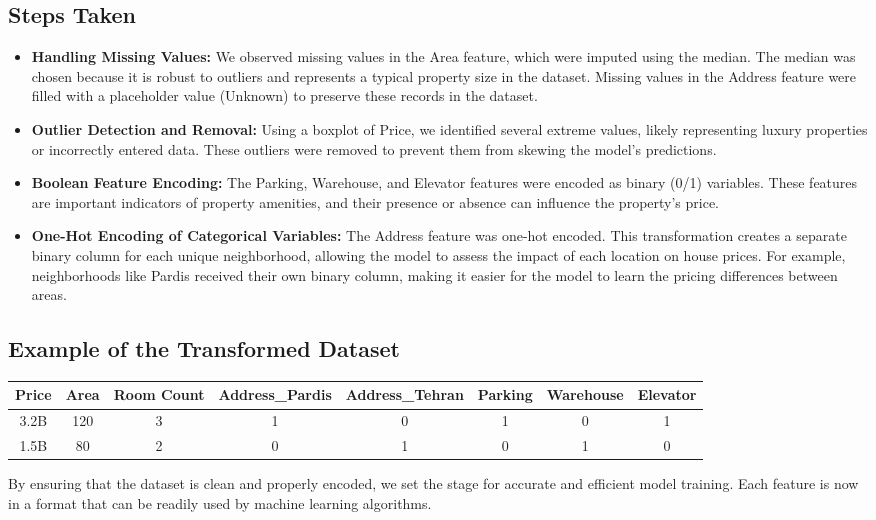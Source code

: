\documentclass{article}
\begin{document}
\subsection{Steps Taken}
\begin{itemize}
    \item \textbf{Handling Missing Values:} We observed missing values in the Area feature, which were imputed using the median. The median was chosen because it is robust to outliers and represents a typical property size in the dataset. Missing values in the Address feature were filled with a placeholder value (Unknown) to preserve these records in the dataset.
    \item \textbf{Outlier Detection and Removal:} Using a boxplot of Price, we identified several extreme values, likely representing luxury properties or incorrectly entered data. These outliers were removed to prevent them from skewing the model's predictions.
    \item \textbf{Boolean Feature Encoding:} The Parking, Warehouse, and Elevator features were encoded as binary (0/1) variables. These features are important indicators of property amenities, and their presence or absence can influence the property's price.
    \item \textbf{One-Hot Encoding of Categorical Variables:} The Address feature was one-hot encoded. This transformation creates a separate binary column for each unique neighborhood, allowing the model to assess the impact of each location on house prices. For example, neighborhoods like Pardis received their own binary column, making it easier for the model to learn the pricing differences between areas.
\end{itemize}

\subsection{Example of the Transformed Dataset}
\begin{center}
\begin{tabular}{cccccccc}
\toprule
Price & Area & Room Count & Address\_Pardis & Address\_Tehran & Parking & Warehouse & Elevator \\
\midrule
3.2B & 120 & 3 & 1 & 0 & 1 & 0 & 1 \\
1.5B & 80 & 2 & 0 & 1 & 0 & 1 & 0 \\
\bottomrule
\end{tabular}
\end{center}

By ensuring that the dataset is clean and properly encoded, we set the stage for accurate and efficient model training. Each feature is now in a format that can be readily used by machine learning algorithms.
\end{document}
